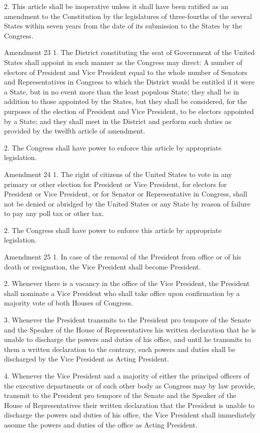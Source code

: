 \documentclass[12pt,a4paper]{article}
\begin{document}
2. This article shall be inoperative unless it shall have been ratified as an
amendment to the Constitution by the legislatures of three-fourths of the
several States within seven years from the date of its submission to the States
by the Congress.

Amendment 23
1. The District constituting the seat of Government of the United States shall
appoint in such manner as the Congress may direct: A number of electors of
President and Vice President equal to the whole number of Senators and
Representatives in Congress to which the District would be entitled if it were
a State, but in no event more than the least populous State; they shall be in
addition to those appointed by the States, but they shall be considered, for
the purposes of the election of President and Vice President, to be electors
appointed by a State; and they shall meet in the District and perform such
duties as provided by the twelfth article of amendment.

2. The Congress shall have power to enforce this article by appropriate
legislation.

Amendment 24
1. The right of citizens of the United States to vote in any primary or other
election for President or Vice President, for electors for President or
Vice President, or for Senator or Representative in Congress, shall not be
denied or abridged by the United States or any State by reason of failure to
pay any poll tax or other tax.

2. The Congress shall have power to enforce this article by appropriate
legislation.

Amendment 25
1. In case of the removal of the President from office or of his death or
resignation, the Vice President shall become President.

2. Whenever there is a vacancy in the office of the Vice President, the
President shall nominate a Vice President who shall take office upon
confirmation by a majority vote of both Houses of Congress.

3. Whenever the President transmits to the President pro tempore of the Senate
and the Speaker of the House of Representatives his written declaration that he
is unable to discharge the powers and duties of his office, and until he
transmits to them a written declaration to the contrary, such powers and duties
shall be discharged by the Vice President as Acting President.

4. Whenever the Vice President and a majority of either the principal officers
of the executive departments or of such other body as Congress may by law
provide, transmit to the President pro tempore of the Senate and the Speaker of
the House of Representatives their written declaration that the President is
unable to discharge the powers and duties of his office, the Vice President
shall immediately assume the powers and duties of the office as Acting
President.
\end{document}
